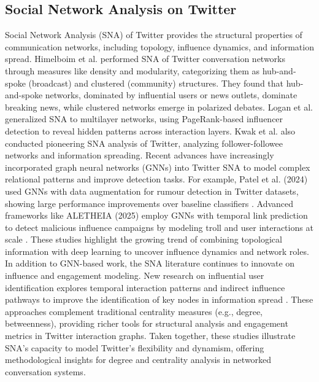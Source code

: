 \subsection{Social Network Analysis on Twitter}
Social Network Analysis (SNA) of Twitter provides the structural properties of communication networks, including topology, influence dynamics, and information spread. Himelboim et al. \citep{himelboim2017classifying} performed SNA of Twitter conversation networks through measures like density and modularity, categorizing them as hub-and-spoke (broadcast) and clustered (community) structures. They found that hub-and-spoke networks, dominated by influential users or news outlets, dominate breaking news, while clustered networks emerge in polarized debates. Logan et al. \citep{logan2023modeling} generalized SNA to multilayer networks, using PageRank-based influencer detection to reveal hidden patterns across interaction layers. Kwak et al. \citep{kwak2010what} also conducted pioneering SNA analysis of Twitter, analyzing follower-followee networks and information spreading.
Recent advances have increasingly incorporated graph neural networks (GNNs) into Twitter SNA to model complex relational patterns and improve detection tasks. For example, Patel et al. (2024) used GNNs with data augmentation for rumour detection in Twitter datasets, showing large performance improvements over baseline classifiers \citep{patel2024rumour}. Advanced frameworks like ALETHEIA (2025) employ GNNs with temporal link prediction to detect malicious influence campaigns by modeling troll and user interactions at scale \citep{saeed2025aletheia}. These studies highlight the growing trend of combining topological information with deep learning to uncover influence dynamics and network roles.
In addition to GNN-based work, the SNA literature continues to innovate on influence and engagement modeling. New research on influential user identification explores temporal interaction patterns and indirect influence pathways to improve the identification of key nodes in information spread \citep{hassanpour2026identification}. These approaches complement traditional centrality measures (e.g., degree, betweenness), providing richer tools for structural analysis and engagement metrics in Twitter interaction graphs. Taken together, these studies illustrate SNA’s capacity to model Twitter’s flexibility and dynamism, offering methodological insights for degree and centrality analysis in networked conversation systems.
